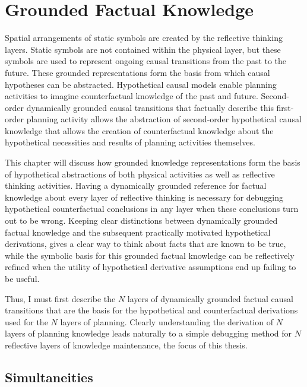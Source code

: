 \chapter{Grounded Factual Knowledge}
\label{chapter:grounded_factual_knowledge}

Spatial arrangements of static symbols are created by the reflective
thinking layers.  Static symbols are not contained within the physical
layer, but these symbols are used to represent ongoing causal
transitions from the past to the future.  These grounded
representations form the basis from which causal hypotheses can be
abstracted.  Hypothetical causal models enable planning activities to
imagine counterfactual knowledge of the past and future.  Second-order
dynamically grounded causal transitions that factually describe this
first-order planning activity allows the abstraction of second-order
hypothetical causal knowledge that allows the creation of
counterfactual knowledge about the hypothetical necessities and
results of planning activities themselves.

This chapter will discuss how grounded knowledge representations form
the basis of hypothetical abstractions of both physical activities as
well as reflective thinking activities.  Having a dynamically grounded
reference for factual knowledge about every layer of reflective
thinking is necessary for debugging hypothetical counterfactual
conclusions in any layer when these conclusions turn out to be wrong.
Keeping clear distinctions between dynamically grounded factual
knowledge and the subsequent practically motivated hypothetical
derivations, gives a clear way to think about facts that are known to
be true, while the symbolic basis for this grounded factual knowledge
can be reflectively refined when the utility of hypothetical
derivative assumptions end up failing to be useful.

Thus, I must first describe the $N$ layers of dynamically grounded
factual causal transitions that are the basis for the hypothetical and
counterfactual derivations used for the $N$ layers of planning.
Clearly understanding the derivation of $N$ layers of planning
knowledge leads naturally to a simple debugging method for $N$
reflective layers of knowledge maintenance, the focus of this thesis.

\section{Simultaneities}

